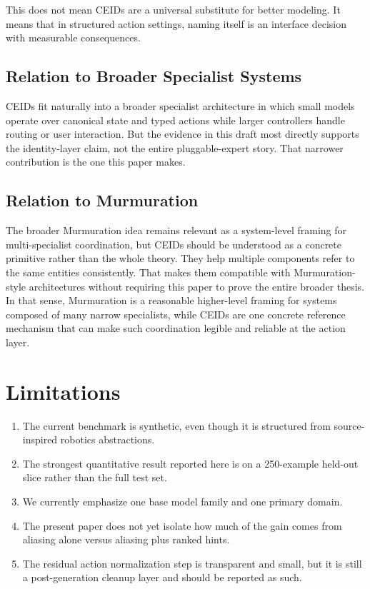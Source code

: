 \documentclass[manuscript,screen,review]{jair}
\begin{document}
This does not mean CEIDs are a universal substitute for better modeling. It means that in structured action settings, naming itself is an interface decision with measurable consequences.

\subsection{Relation to Broader Specialist Systems}
CEIDs fit naturally into a broader specialist architecture in which small models operate over canonical state and typed actions while larger controllers handle routing or user interaction. But the evidence in this draft most directly supports the identity-layer claim, not the entire pluggable-expert story. That narrower contribution is the one this paper makes.

\subsection{Relation to Murmuration}
The broader Murmuration idea remains relevant as a system-level framing for multi-specialist coordination, but CEIDs should be understood as a concrete primitive rather than the whole theory. They help multiple components refer to the same entities consistently. That makes them compatible with Murmuration-style architectures without requiring this paper to prove the entire broader thesis. In that sense, Murmuration is a reasonable higher-level framing for systems composed of many narrow specialists, while CEIDs are one concrete reference mechanism that can make such coordination legible and reliable at the action layer.

\section{Limitations}
\begin{enumerate}[leftmargin=*,itemsep=0.25em]
  \item The current benchmark is synthetic, even though it is structured from source-inspired robotics abstractions.
  \item The strongest quantitative result reported here is on a 250-example held-out slice rather than the full test set.
  \item We currently emphasize one base model family and one primary domain.
  \item The present paper does not yet isolate how much of the gain comes from aliasing alone versus aliasing plus ranked hints.
  \item The residual action normalization step is transparent and small, but it is still a post-generation cleanup layer and should be reported as such.
\end{enumerate}
\end{document}
